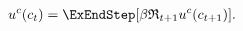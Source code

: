   \begin{equation}\begin{gathered}\begin{aligned}
        \uFunc^{c}(c_{t})  & = \ExEndStep[\DiscFac {\Rport}_{t+1} \uFunc^{c}(c_{t+1})]. \label{eq:EulercRiskyR}
      \end{aligned}\end{gathered}\end{equation}
